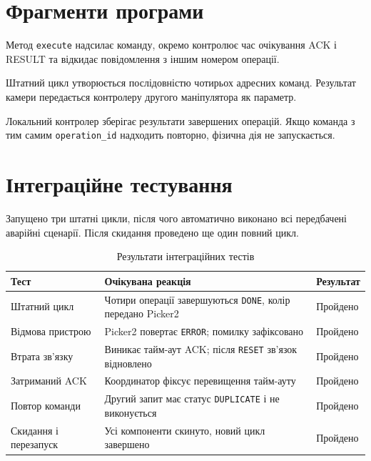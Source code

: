 \documentclass[12pt,a4paper]{article}
\begin{document}
\section{Фрагменти програми}
Метод \texttt{execute} надсилає команду, окремо контролює час очікування
ACK і RESULT та відкидає повідомлення з іншим номером операції.



Штатний цикл утворюється послідовністю чотирьох адресних команд. Результат
камери передається контролеру другого маніпулятора як параметр.



Локальний контролер зберігає результати завершених операцій. Якщо команда
з тим самим \texttt{operation\_id} надходить повторно, фізична дія не
запускається.



\section{Інтеграційне тестування}
Запущено три штатні цикли, після чого автоматично виконано всі передбачені
аварійні сценарії. Після скидання проведено ще один повний цикл.

\begin{table}[H]
\centering\small\setlength{\tabcolsep}{4pt}
\begin{tabularx}{\textwidth}{@{}p{}Yp{0.17\textwidth}@{}}
\toprule
\textbf{Тест} & \textbf{Очікувана реакція} & \textbf{Результат} \\
\midrule
Штатний цикл & Чотири операції завершуються \texttt{DONE}, колір передано Picker2 & Пройдено \\
Відмова пристрою & Picker2 повертає \texttt{ERROR}; помилку зафіксовано & Пройдено \\
Втрата зв'язку & Виникає тайм-аут ACK; після \texttt{RESET} зв'язок відновлено & Пройдено \\
Затриманий ACK & Координатор фіксує перевищення тайм-ауту & Пройдено \\
Повтор команди & Другий запит має статус \texttt{DUPLICATE} і не виконується & Пройдено \\
Скидання і перезапуск & Усі компоненти скинуто, новий цикл завершено & Пройдено \\
\bottomrule
\end{tabularx}
\caption{Результати інтеграційних тестів}
\label{tab:tests}
\end{table}
\end{document}
